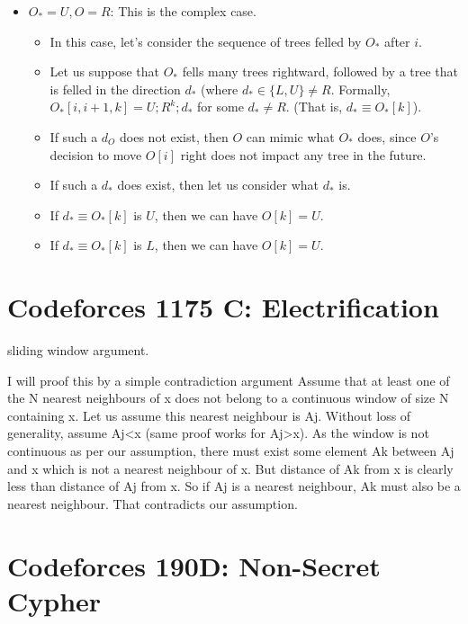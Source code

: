 \documentclass[14pt]{report}
\begin{document}
\begin{itemize}
\item $O_*=U, O=R$: This is the complex case.
    \begin{itemize}
            \item In this case, let's consider the sequence of trees felled by $O_*$ after $i$.
            \item Let us suppose that $O_*$ fells many trees rightward,
                followed by a tree that is felled in the direction $d_*$ (where
                $d_* \in \{L, U \} \neq R$.  Formally, $O_*[i, i+1, k] = U; R^k; d_*$ for
                some $d_* \neq R$. (That is, $d_* \equiv O_*[k]$).
            \item If such a $d_O$ does not exist, then $O$ can
                mimic what $O_*$ does, since $O$'s decision to move $O[i]$ right does not impact any tree in the future.
            \item If such a $d_*$ does exist, then let us consider what $d_*$ is.
            \item If $d_* \equiv O_*[k]$ is $U$, then we can have $O[k] = U$.
            \item If $d_* \equiv O_*[k]$ is $L$, then we can have $O[k] = U$.
    \end{itemize}
\end{itemize}

\newpage

\section{Codeforces  1175 C: Electrification}

sliding window argument.

I will proof this by a simple contradiction argument Assume that at least one of the N nearest neighbours of x does not belong to a continuous window of size N containing x. Let us assume this nearest neighbour is Aj. Without loss of generality, assume Aj<x (same proof works for Aj>x). As the window is not continuous as per our assumption, there must exist some element Ak between Aj and x which is not a nearest neighbour of x. But distance of Ak from x is clearly less than distance of Aj from x. So if Aj is a nearest neighbour, Ak must also be a nearest neighbour. That contradicts our assumption.


\newpage


\section{Codeforces 190D: Non-Secret Cypher}
\end{document}
